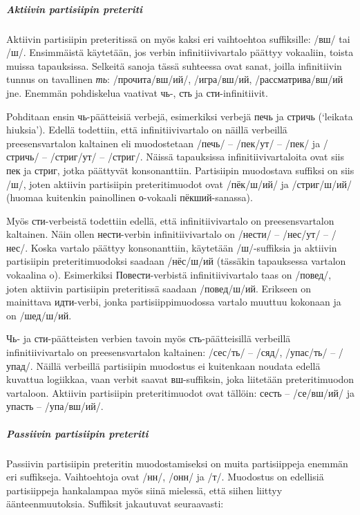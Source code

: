 \documentclass[]{scrartcl}
\begin{document}
\subparagraph{Aktiivin partisiipin
preteriti}\label{aktiivin-partisiipin-preteriti}

Aktiivin partisiipin preteritissä on myös kaksi eri vaihtoehtoa
suffiksille: /вш/ tai /ш/. Ensimmäistä käytetään, jos verbin
infinitiivivartalo päättyy vokaaliin, toista muissa tapauksissa.
Selkeitä sanoja tässä suhteessa ovat sanat, joilla infinitiivin tunnus
on tavallinen \emph{ть}: /прочита/вш/ий/, /игра/вш/ий,
/рассматрива/вш/ий jne. Enemmän pohdiskelua vaativat чь-, сть ja
сти-infinitiivit.

Pohditaan ensin чь-päätteisiä verbejä, esimerkiksi verbejä печь ja
стричь (`leikata hiuksia'). Edellä todettiin, että infinitiivivartalo on
näillä verbeillä preesensvartalon kaltainen eli muodostetaan /печь/ --
/пек/ут/ -- /пек/ ja /стричь/ -- /стриг/ут/ -- /стриг/. Näissä
tapauksissa infinitiivivartaloita ovat siis пек ja стриг, jotka
päättyvät konsonanttiin. Partisiipin muodostava suffiksi on siis /ш/,
joten aktiivin partisiipin preteritimuodot ovat /пёк/ш/ий/ ja
/стриг/ш/ий/ (huomaa kuitenkin painollinen о-vokaali пёкший-sanassa).

Myös сти-verbeistä todettiin edellä, että infinitiivivartalo on
preesensvartalon kaltainen. Näin ollen нести-verbin infinitiivivartalo
on /нести/ -- /нес/ут/ -- /нес/. Koska vartalo päättyy konsonanttiin,
käytetään /ш/-suffiksia ja aktiivin partisiipin preteritimuodoksi
saadaan /нёс/ш/ий (tässäkin tapauksessa vartalon vokaalina o).
Esimerkiksi Повести-verbistä infinitiivivartalo taas on /повед/, joten
aktiivin partisiipin preteritissä saadaan /повед/ш/ий. Erikseen on
mainittava идти-verbi, jonka partisiippimuodossa vartalo muuttuu
kokonaan ja on /шед/ш/ий.

Чь- ja сти-päätteisten verbien tavoin myös сть-päätteisillä verbeillä
infinitiivivartalo on preesensvartalon kaltainen: /сес/ть/ -- /сяд/,
/упас/ть/ -- /упад/. Näillä verbeillä partisiipin muodostus ei
kuitenkaan noudata edellä kuvattua logiikkaa, vaan verbit saavat
вш-suffiksin, joka liitetään preteritimuodon vartaloon. Aktiivin
partisiipin preteritimuodot ovat tällöin: сесть -- /се/вш/ий/ ja упасть
-- /упа/вш/ий/.

\subparagraph{Passiivin partisiipin
preteriti}\label{passiivin-partisiipin-preteriti}

Passiivin partisiipin preteritin muodostamiseksi on muita partisiippeja
enemmän eri suffikseja. Vaihtoehtoja ovat /нн/, /онн/ ja /т/. Muodostus
on edellisiä partisiippeja hankalampaa myös siinä mielessä, että siihen
liittyy äänteenmuutoksia. Suffiksit jakautuvat seuraavasti:
\end{document}

